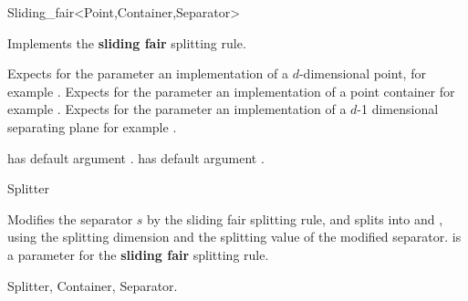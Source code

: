 

\begin{ccRefFunctionObjectClass}{Sliding_fair<Point,Container,Separator>}  %



\ccDefinition
Implements the {\bf sliding fair} splitting rule.

\ccParameters

Expects for the parameter  an implementation of a $d$-dimensional point,
for example . Expects for the parameter  an implementation
of a point container for example .
Expects for the parameter  an implementation of a $d$-1 dimensional 
separating plane for example .

 has default argument .
 has default argument . 


\ccIsModel

Splitter

\ccTypes






\ccOperations

{Modifies the separator $s$ by the sliding fair splitting rule, 
and splits  into  and ,
using the splitting dimension and the splitting value of the modified separator.
 is a parameter for the {\bf sliding fair} splitting rule.
}

\ccSeeAlso

Splitter, Container, Separator.

\end{ccRefFunctionObjectClass}



